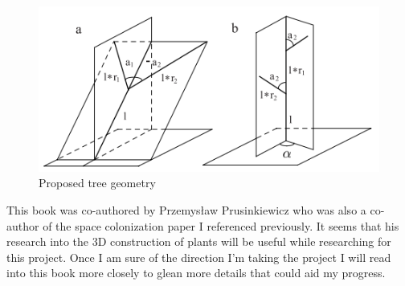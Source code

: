 \documentclass[proposal]{cmpreport}
\begin{document}
\begin{figure}[h]
        \caption{Proposed tree geometry}
        \includegraphics{MDbranches}
        \centering
\end{figure}

This book was co-authored by Przemysław Prusinkiewicz who was also a co-author of the 
space colonization paper I referenced previously. It seems that his research into 
the 3D construction of plants will be useful while researching for this project. 
Once I am sure of the direction I'm taking the project I will read into this book more 
closely to glean more details that could aid my progress.

\pagebreak
\end{document}
